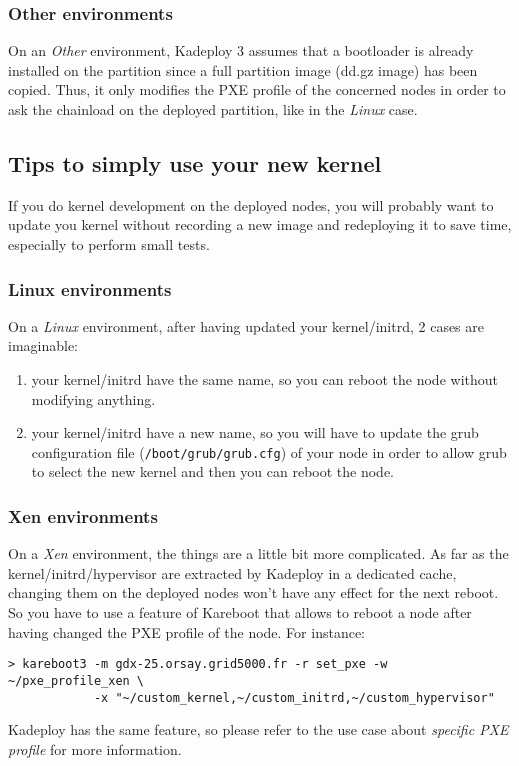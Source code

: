 \documentclass[a4wide,10pt,oneside]{book}
\begin{document}
\subsubsection{Other environments}
On an \emph{Other} environment, Kadeploy 3 assumes that a bootloader is already installed on the partition since a full partition image (dd.gz image) has been copied. Thus, it only modifies the PXE profile of the concerned nodes in order to ask the chainload on the deployed partition, like in the \emph{Linux} case.

\subsection{Tips to simply use your new kernel}
If you do kernel development on the deployed nodes, you will probably want to update you kernel without recording a new image and redeploying it to save time, especially to perform small tests.

\subsubsection{Linux environments}
On a \emph{Linux} environment, after having updated your kernel/initrd, 2 cases are imaginable:
\begin{enumerate}
\item your kernel/initrd have the same name, so you can reboot the node without modifying anything.
\item your kernel/initrd have a new name, so you will have to update the grub configuration file (\texttt{/boot/grub/grub.cfg}) of your node in order to allow grub to select the new kernel and then you can reboot the node.
\end{enumerate}

\subsubsection{Xen environments}
On a \emph{Xen} environment, the things are a little bit more complicated. As far as the kernel/initrd/hypervisor are extracted by Kadeploy in a dedicated cache, changing them on the deployed nodes won't have any effect for the next reboot. So you have to use a feature of Kareboot that allows to reboot a node after having changed the PXE profile of the node. For instance:
\begin{verbatim}
> kareboot3 -m gdx-25.orsay.grid5000.fr -r set_pxe -w ~/pxe_profile_xen \
            -x "~/custom_kernel,~/custom_initrd,~/custom_hypervisor"
\end{verbatim}
Kadeploy has the same feature, so please refer to the use case about \textit{specific PXE profile} for more information.
\end{document}
